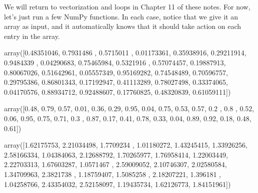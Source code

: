 \documentclass[letterpaper,10pt,english]{sphinxmanual}
\begin{document}
We will return to vectorization and loops in Chapter 11 of these notes.  For now, let’s just run a few NumPy functions.  In each case, notice that we give it an array as input, and it automatically knows that it should take action on each entry in the array.

\begin{sphinxVerbatim}[commandchars=\\\{\}]
   
    
\end{sphinxVerbatim}

\begin{sphinxVerbatim}[commandchars=\\\{\}]
array([0.48351046, 0.7931486 , 0.5715011 , 0.01173361, 0.35938916,
       0.29211914, 0.9484339 , 0.04290683, 0.75465984, 0.5321916 ,
       0.57074457, 0.19887913, 0.80067026, 0.51642961, 0.05557349,
       0.95169282, 0.74548489, 0.70596757, 0.29795386, 0.86801343,
       0.17192947, 0.41113289, 0.78027498, 0.33374065, 0.04170576,
       0.88934712, 0.92488607, 0.17760825, 0.48320839, 0.61059111])
\end{sphinxVerbatim}

\begin{sphinxVerbatim}[commandchars=\\\{\}]
    
\end{sphinxVerbatim}

\begin{sphinxVerbatim}[commandchars=\\\{\}]
array([0.48, 0.79, 0.57, 0.01, 0.36, 0.29, 0.95, 0.04, 0.75, 0.53, 0.57,
       0.2 , 0.8 , 0.52, 0.06, 0.95, 0.75, 0.71, 0.3 , 0.87, 0.17, 0.41,
       0.78, 0.33, 0.04, 0.89, 0.92, 0.18, 0.48, 0.61])
\end{sphinxVerbatim}

\begin{sphinxVerbatim}[commandchars=\\\{\}]
   
\end{sphinxVerbatim}

\begin{sphinxVerbatim}[commandchars=\\\{\}]
array([1.62175753, 2.21034498, 1.7709234 , 1.01180272, 1.43245415,
       1.33926256, 2.58166334, 1.04384063, 2.12688792, 1.70265977,
       1.76958414, 1.22003449, 2.22703313, 1.67603287, 1.0571467 ,
       2.59009052, 2.10746307, 2.02580584, 1.34709963, 2.3821738 ,
       1.18759407, 1.5085258 , 2.18207221, 1.396181  , 1.04258766,
       2.43354032, 2.52158097, 1.19435734, 1.62126773, 1.84151961])
\end{sphinxVerbatim}
\end{document}
